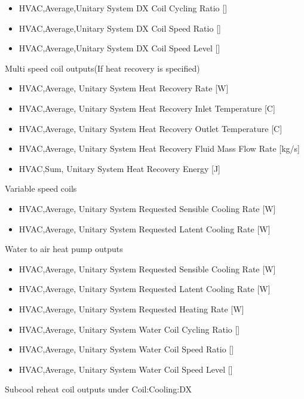\begin{itemize}
\item
  HVAC,Average,Unitary System DX Coil Cycling Ratio {[]}
\item
  HVAC,Average,Unitary System DX Coil Speed Ratio {[]}
\item
  HVAC,Average,Unitary System DX Coil Speed Level {[]}
\end{itemize}

Multi speed coil outputs(If heat recovery is specified)

\begin{itemize}
\item
  HVAC,Average, Unitary System Heat Recovery Rate {[}W{]}
\item
  HVAC,Average, Unitary System Heat Recovery Inlet Temperature {[}C{]}
\item
  HVAC,Average, Unitary System Heat Recovery Outlet Temperature {[}C{]}
\item
  HVAC,Average, Unitary System Heat Recovery Fluid Mass Flow Rate {[}kg/s{]}
\item
  HVAC,Sum, Unitary System Heat Recovery Energy {[}J{]}
\end{itemize}

Variable speed coils

\begin{itemize}
\item
  HVAC,Average, Unitary System Requested Sensible Cooling Rate {[}W{]}
\item
  HVAC,Average, Unitary System Requested Latent Cooling Rate {[}W{]}
\end{itemize}


Water to air heat pump outputs

\begin{itemize}
\item
  HVAC,Average, Unitary System Requested Sensible Cooling Rate {[}W{]}
\item
  HVAC,Average, Unitary System Requested Latent Cooling Rate {[}W{]}
\item
  HVAC,Average, Unitary System Requested Heating Rate {[}W{]}
\item
  HVAC,Average, Unitary System Water Coil Cycling Ratio {[]}
\item
  HVAC,Average, Unitary System Water Coil Speed Ratio {[]}
\item
  HVAC,Average, Unitary System Water Coil Speed Level {[]}
\end{itemize}

Subcool reheat coil outputs under Coil:Cooling:DX

